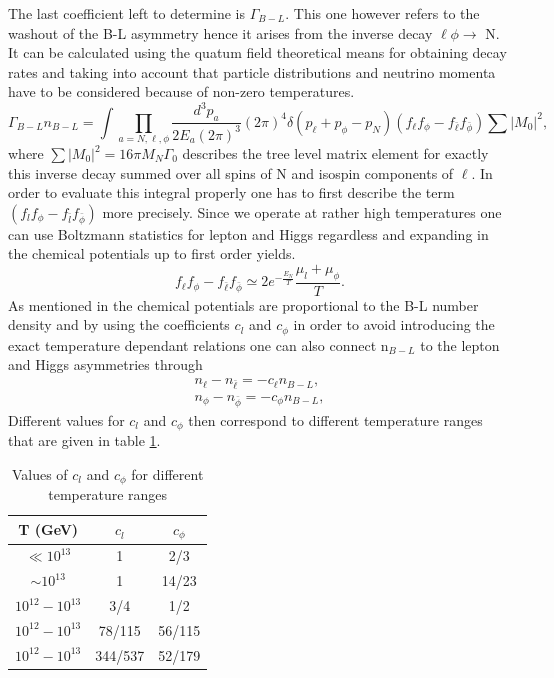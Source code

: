 The last coefficient left to determine is $\Gamma_{B-L}$. This one however refers to the washout of the B-L asymmetry hence it arises from the inverse decay $\ell\phi\rightarrow$ N. It can be calculated using the quatum field theoretical means for obtaining decay rates and taking into account that particle distributions and neutrino momenta have to be considered because of non-zero temperatures.
\begin{equation}
\Gamma_{B-L}n_{B-L}=\int\prod_{a=N,\ell,\phi}\frac{d^3p_a}{2E_a(2\pi)^3}(2\pi)^4\delta(p_\ell+p_\phi-p_N)(	f_\ell f_\phi-f_{\bar{\ell}}f_{\bar{\phi}})\sum|M_0|^2,
\label{eq:Gamma_B-L}
\end{equation}
where $\sum|M_0|^2=16\pi M_N\Gamma_0$ describes the tree level matrix element for exactly this inverse decay summed over all spins of N and isospin components of $\ell$. In order to evaluate this integral properly one has to first describe the term $(	f_lf_\phi-f_{\bar{l}}f_{\bar{\phi}})$ more precisely. Since we operate at rather high temperatures one can use Boltzmann statistics for lepton and Higgs regardless and expanding in the chemical potentials up to first order yields.
\begin{equation}
	f_\ell f_\phi-f_{\bar{\ell}}f_{\bar{\phi}}\simeq 2e^{-\frac{E_N}{T}}\frac{\mu_l+\mu_\phi}{T}.
	\label{eq:distri_diff}
\end{equation}
As mentioned in \cite[p. 7]{Bodeker:2013qaa} the chemical potentials are proportional to the B-L number density and by using the coefficients $c_l$ and $c_\phi$ in order to avoid introducing the exact temperature dependant relations one can also connect n$_{B-L}$ to the lepton and Higgs asymmetries through \cite[p. 7]{Bodeker:2013qaa}
\begin{align}
	n_\ell-n_{\bar{\ell}}=-c_\ell n_{B-L},
	\label{eq:l-lbar} \\
	n_\phi-n_{\bar{\phi}}=-c_\phi n_{B-L},
	\label{eq:phi-phibar}
\end{align}
Different values for $c_l$ and $c_\phi$ then correspond to different temperature ranges that are given in table \ref{tab:temperatur}\cite[Table 1]{Bodeker:2013qaa}.

	\begin{table}[H]
	\centering
	\begin{tabular}{c|c||c}
	T (GeV)& $c_l$ & $c_\phi$\\
	\hline
	$\ll10^{13}$&1&2/3\\
	$\sim10^{13}$&1&14/23\\
	$10^{12}-10^{13}$&3/4&1/2\\
	$10^{12}-10^{13}$&78/115&56/115\\
	$10^{12}-10^{13}$&344/537&52/179\\
	
	\end{tabular}
	\caption{Values of $c_l$ and $c_\phi$ for different temperature ranges}
	\label{tab:temperatur}
	\end{table}

